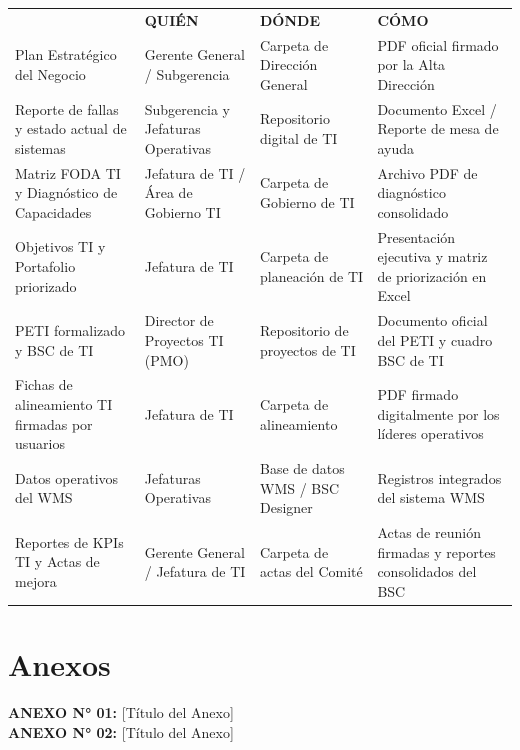 \documentclass[11pt,letterpaper]{report}
\begin{document}
\begin{tabularx}{\textwidth}{>{\raggedright\arraybackslash}X >{\raggedright\arraybackslash}p{} >{\raggedright\arraybackslash}p{} >{\raggedright\arraybackslash}X}
\toprule
\multirow{2}{*}{\textbf{DOCUMENTO (QUÉ)}} & \multicolumn{3}{c}{\textbf{CUSTODIA}} \\
\cmidrule{2-4}
& \textbf{QUIÉN} & \textbf{DÓNDE} & \textbf{CÓMO} \\
\midrule
Plan Estratégico del Negocio & Gerente General / Subgerencia & Carpeta de Dirección General & PDF oficial firmado por la Alta Dirección \\
\midrule
Reporte de fallas y estado actual de sistemas & Subgerencia y Jefaturas Operativas & Repositorio digital de TI & Documento Excel / Reporte de mesa de ayuda \\
\midrule
Matriz FODA TI y Diagnóstico de Capacidades & Jefatura de TI / Área de Gobierno TI & Carpeta de Gobierno de TI & Archivo PDF de diagnóstico consolidado \\
\midrule
Objetivos TI y Portafolio priorizado & Jefatura de TI & Carpeta de planeación de TI & Presentación ejecutiva y matriz de priorización en Excel \\
\midrule
PETI formalizado y BSC de TI & Director de Proyectos TI (PMO) & Repositorio de proyectos de TI & Documento oficial del PETI y cuadro BSC de TI \\
\midrule
Fichas de alineamiento TI firmadas por usuarios & Jefatura de TI & Carpeta de alineamiento & PDF firmado digitalmente por los líderes operativos \\
\midrule
Datos operativos del WMS & Jefaturas Operativas & Base de datos WMS / BSC Designer & Registros integrados del sistema WMS \\
\midrule
Reportes de KPIs TI y Actas de mejora & Gerente General / Jefatura de TI & Carpeta de actas del Comité & Actas de reunión firmadas y reportes consolidados del BSC \\
\bottomrule
\end{tabularx}

\vspace{2em}

\chapter{Anexos}
\textbf{ANEXO N° 01:} [Título del Anexo] \\
\textbf{ANEXO N° 02:} [Título del Anexo]
\end{document}
